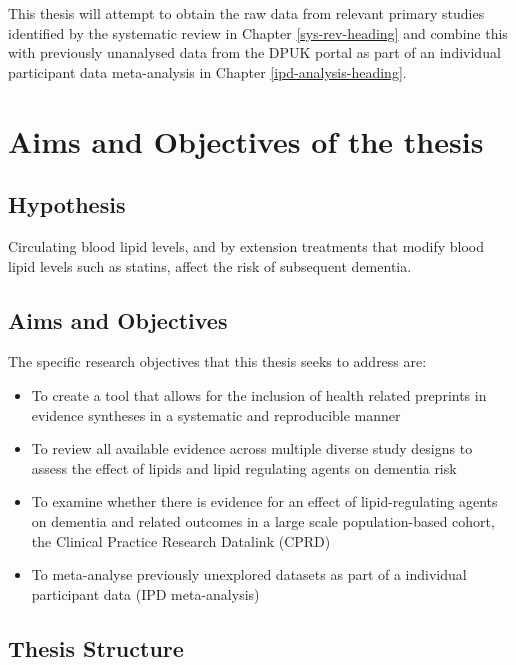 \documentclass[a4paper, twoside]{templates/ociamthesis}
\providecommand{\tightlist}{%
  \setlength{\itemsep}{0pt}\setlength{\parskip}{0pt}}
\begin{document}
This thesis will attempt to obtain the raw data from relevant primary studies identified by the systematic review in Chapter \ref{sys-rev-heading} and combine this with previously unanalysed data from the DPUK portal as part of an individual participant data meta-analysis in Chapter \ref{ipd-analysis-heading}.

\hypertarget{aims-and-objectives-of-the-thesis}{%
\section{Aims and Objectives of the thesis}\label{aims-and-objectives-of-the-thesis}}

\hypertarget{hypothesis}{%
\subsection{Hypothesis}\label{hypothesis}}

Circulating blood lipid levels, and by extension treatments that modify blood lipid levels such as statins, affect the risk of subsequent dementia.

\hypertarget{aims-and-objectives}{%
\subsection{Aims and Objectives}\label{aims-and-objectives}}

The specific research objectives that this thesis seeks to address are:

\begin{itemize}
\tightlist
\item
  To create a tool that allows for the inclusion of health related preprints in evidence syntheses in a systematic and reproducible manner
\item
  To review all available evidence across multiple diverse study designs to assess the effect of lipids and lipid regulating agents on dementia risk
\item
  To examine whether there is evidence for an effect of lipid-regulating agents on dementia and related outcomes in a large scale population-based cohort, the Clinical Practice Research Datalink (CPRD)
\item
  To meta-analyse previously unexplored datasets as part of a individual participant data (IPD meta-analysis)
\end{itemize}

\hypertarget{thesis-structure}{%
\subsection{Thesis Structure}\label{thesis-structure}}
\end{document}
